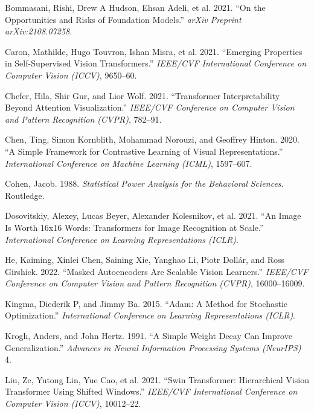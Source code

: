\documentclass[conference,10pt]{IEEEtran}
\newlength{\cslhangindent}
\newenvironment{CSLReferences}[2] %
 {\begin{list}{}{%
  \setlength{\itemindent}{0pt}
  \setlength{\leftmargin}{0pt}
  \setlength{\parsep}{0pt}
  \ifodd #1
   \setlength{\leftmargin}{\cslhangindent}
   \setlength{\itemindent}{-1\cslhangindent}
  \fi
  \setlength{\itemsep}{#2\baselineskip}}}
 {\end{list}}
\begin{document}
\protect{}\label{refs}
\begin{CSLReferences}{1}{1}
{Bommasani, Rishi, Drew A Hudson, Ehsan Adeli, et al.} 2021. {``On the
Opportunities and Risks of Foundation Models.''} \emph{arXiv Preprint
arXiv:2108.07258}.

Caron, Mathilde, Hugo Touvron, Ishan Misra, et al. 2021. {``Emerging
Properties in Self-Supervised Vision Transformers.''} \emph{IEEE/CVF
International Conference on Computer Vision (ICCV)}, 9650--60.

Chefer, Hila, Shir Gur, and Lior Wolf. 2021. {``Transformer
Interpretability Beyond Attention Visualization.''} \emph{IEEE/CVF
Conference on Computer Vision and Pattern Recognition (CVPR)}, 782--91.

Chen, Ting, Simon Kornblith, Mohammad Norouzi, and Geoffrey Hinton.
2020. {``A Simple Framework for Contrastive Learning of Visual
Representations.''} \emph{International Conference on Machine Learning
(ICML)}, 1597--607.

Cohen, Jacob. 1988. \emph{Statistical Power Analysis for the Behavioral
Sciences}. Routledge.

{Dosovitskiy, Alexey, Lucas Beyer, Alexander Kolesnikov, et al.} 2021.
{``An Image Is Worth 16x16 Words: Transformers for Image Recognition at
Scale.''} \emph{International Conference on Learning Representations
(ICLR)}.

He, Kaiming, Xinlei Chen, Saining Xie, Yanghao Li, Piotr Dollár, and
Ross Girshick. 2022. {``Masked Autoencoders Are Scalable Vision
Learners.''} \emph{IEEE/CVF Conference on Computer Vision and Pattern
Recognition (CVPR)}, 16000--16009.

Kingma, Diederik P, and Jimmy Ba. 2015. {``Adam: A Method for Stochastic
Optimization.''} \emph{International Conference on Learning
Representations (ICLR)}.

Krogh, Anders, and John Hertz. 1991. {``A Simple Weight Decay Can
Improve Generalization.''} \emph{Advances in Neural Information
Processing Systems (NeurIPS)} 4.

Liu, Ze, Yutong Lin, Yue Cao, et al. 2021. {``Swin Transformer:
Hierarchical Vision Transformer Using Shifted Windows.''} \emph{IEEE/CVF
International Conference on Computer Vision (ICCV)}, 10012--22.


\end{CSLReferences}
\end{document}
